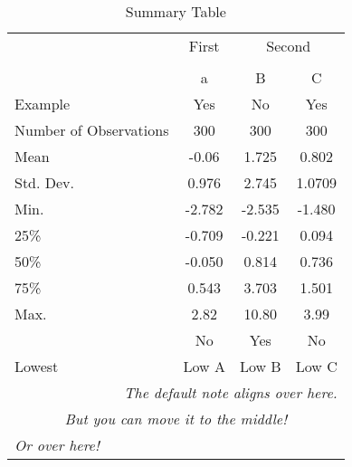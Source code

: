 \begin{table}[!ht]
  \centering
  \caption{Summary Table}
  \label{table:summarytable}
\begin{tabular}{lccc}
  \toprule
  \toprule
  & \multicolumn{1}{c}{First} & \multicolumn{2}{c}{Second} \\
  \cmidrule(lr){2-2}\cmidrule(lr){3-4} \\
   & a & B & C\\
  Example & Yes & No & Yes\\
  \midrule
  Number of Observations & 300 & 300 & 300 \\
  Mean & -0.06 & 1.725 & 0.802 \\
  Std. Dev. & 0.976 & 2.745 & 1.0709 \\
  Min. & -2.782 & -2.535 & -1.480 \\
  25\% & -0.709 & -0.221 & 0.094 \\
  50\% & -0.050 & 0.814 & 0.736 \\
  75\% & 0.543 & 3.703 & 1.501 \\
  Max. & 2.82 & 10.80 & 3.99 \\
   & No & Yes & No\\
  \bottomrule
  Lowest & Low A & Low B & Low C\\
  \bottomrule
  \multicolumn{4}{r}{{\small \textit{The default note aligns over here.}}}\\
  \multicolumn{4}{c}{{\small \textit{But you can move it to the middle!}}}\\
  \multicolumn{4}{l}{{\small \textit{Or over here!}}}\\
\end{tabular}
\end{table}
